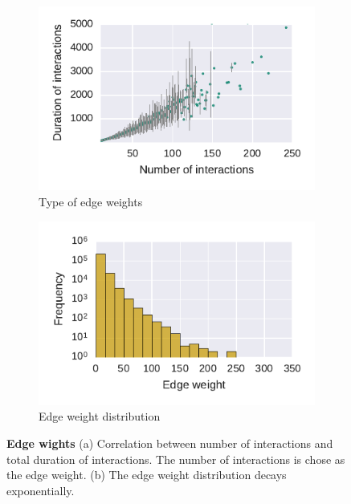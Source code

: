 \begin{figure}[htbp]
	\centering
	\begin{subfigure}[b]{0.49\textwidth}
	\centering
	\includegraphics[width=1.0\textwidth]{Figures/n3-freqVSduration}
	\caption[Type of edge weights]{Type of edge weights}
	\label{fig:fVSd}
	\end{subfigure} 
	\begin{subfigure}[b]{0.49\textwidth}
	\centering
	\includegraphics[width=1.0\textwidth]{Figures/n3-edgeWeightDist.pdf}
	\caption[Edge weight distribution]{Edge weight distribution}
	\label{fig:edgeWdist}
	\end{subfigure}
	\caption[Edge wights]{\textbf{Edge wights} (a) Correlation between number of interactions and total duration of interactions. The number of interactions is chose as the edge weight. (b)  The edge weight distribution decays exponentially.}
	\label{fig:edges}
\end{figure}

